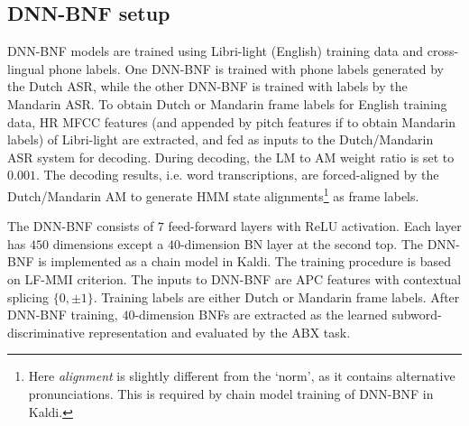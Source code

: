 \documentclass[a4paper]{article}
\begin{document}

\subsection{DNN-BNF setup}
DNN-BNF models are trained using Libri-light (English) training data and cross-lingual phone labels. 
One DNN-BNF  is trained with phone labels generated by the Dutch ASR, while the other DNN-BNF is trained with labels by the Mandarin ASR. To obtain Dutch or Mandarin frame labels for English training data,  HR MFCC features (and appended by pitch features if to obtain Mandarin labels) of Libri-light are extracted, and fed as inputs to the Dutch/Mandarin ASR system for decoding. 
During decoding, the LM to AM weight ratio is set to $0.001$.
The decoding results, i.e. word transcriptions,  are  forced-aligned by the Dutch/Mandarin AM to generate HMM state alignments\footnote{Here \textit{alignment} is slightly different from the `norm', as it contains alternative pronunciations. This is required by chain model training of DNN-BNF in Kaldi.} as frame labels.

The DNN-BNF consists of $7$ feed-forward layers with ReLU activation. Each layer has $450$ dimensions except a $40$-dimension BN layer at the second top. The DNN-BNF is implemented  as a chain model in Kaldi. The training procedure  is based on  LF-MMI criterion. 
The inputs to DNN-BNF are APC  features with contextual splicing $\{0,\pm 1\}$.
Training labels are either Dutch  or Mandarin frame labels. After DNN-BNF training, $40$-dimension BNFs are extracted as the learned subword-discriminative representation and evaluated by the ABX task.

\end{document}
